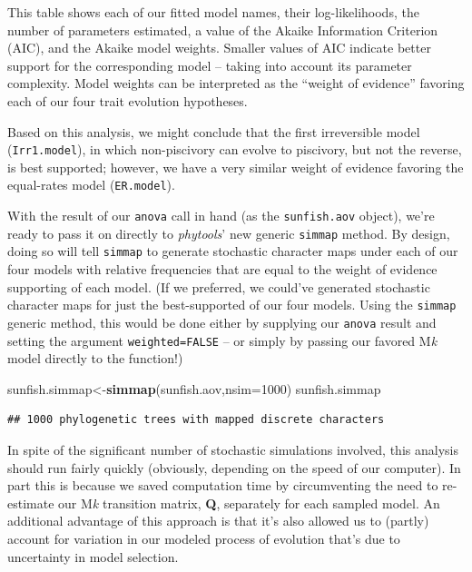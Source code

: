 \documentclass[fleqn,10pt,lineno]{wlpeerj} %
\newenvironment{Shaded}{\begin{snugshade}}{\end{snugshade}}
\newcommand{\AttributeTok}[1]{\textcolor[rgb]{0.13,0.29,0.53}{#1}}
\newcommand{\DecValTok}[1]{\textcolor[rgb]{0.00,0.00,0.81}{#1}}
\newcommand{\FunctionTok}[1]{\textcolor[rgb]{0.13,0.29,0.53}{\textbf{#1}}}
\newcommand{\NormalTok}[1]{#1}
\newcommand{\OtherTok}[1]{\textcolor[rgb]{0.56,0.35,0.01}{#1}}
\begin{document}
This table shows each of our fitted model names, their log-likelihoods, the number of parameters estimated, a value of the Akaike Information Criterion (AIC), and the Akaike model weights. Smaller values of AIC indicate better support for the corresponding model -- taking into account its parameter complexity. Model weights can be interpreted as the ``weight of evidence'' favoring each of our four trait evolution hypotheses.

Based on this analysis, we might conclude that the first irreversible model (\texttt{Irr1.model}), in which non-piscivory can evolve to piscivory, but not the reverse, is best supported; however, we have a very similar weight of evidence favoring the equal-rates model (\texttt{ER.model}).

With the result of our \texttt{anova} call in hand (as the \texttt{sunfish.aov} object), we're ready to pass it on directly to \emph{phytools}' new generic \texttt{simmap} method. By design, doing so will tell \texttt{simmap} to generate stochastic character maps under each of our four models with relative frequencies that are equal to the weight of evidence supporting of each model. (If we preferred, we could've generated stochastic character maps for just the best-supported of our four models. Using the \texttt{simmap} generic method, this would be done either by supplying our \texttt{anova} result and setting the argument \texttt{weighted=FALSE} -- or simply by passing our favored M\emph{k} model directly to the function!)

\begin{Shaded}
\begin{Highlighting}[]
\NormalTok{sunfish.simmap}\OtherTok{\textless{}{-}}\FunctionTok{simmap}\NormalTok{(sunfish.aov,}\AttributeTok{nsim=}\DecValTok{1000}\NormalTok{)}
\NormalTok{sunfish.simmap}
\end{Highlighting}
\end{Shaded}

\begin{verbatim}
## 1000 phylogenetic trees with mapped discrete characters
\end{verbatim}

In spite of the significant number of stochastic simulations involved, this analysis should run fairly quickly (obviously, depending on the speed of our computer). In part this is because we saved computation time by circumventing the need to re-estimate our M\emph{k} transition matrix, \textbf{Q}, separately for each sampled model. An additional advantage of this approach is that it's also allowed us to (partly) account for variation in our modeled process of evolution that's due to uncertainty in model selection.
\end{document}
